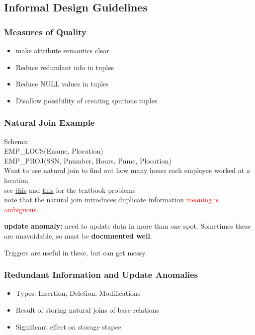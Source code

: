 \documentclass[12pt]{article}
\begin{document}
\subsection{Informal Design Guidelines}
\subsubsection{Measures of Quality}
\begin{itemize}
  \item make attribute semantics clear
  \item Reduce redundant info in tuples
  \item Reduce NULL values in tuples
  \item Disallow possibility of creating spurious tuples
\end{itemize}

\subsubsection{Natural Join Example}
Schema:\\
EMP\_LOCS(Ename, Plocation)\\
EMP\_PROJ(SSN, Pnumber, Hours, Pnme, Plocation)\\
Want to use natural join to find out how many hours each employee worked at a
location\\
see
\href{http://cise.ufl.edu/class/cis4301sp14/slides/natural_join0.jpg}{this} and
\href{http://cise.ufl.edu/class/cis4301sp14/slides/natural_join0.jpg}{this}
for the textbook problems\\
note that the natural join introduces duplicate information
\textcolor{red}{meaning is ambiguous}.

\textbf{update anomaly:} need to update data in more than one spot. Sometimes
these are unavoidable, so must be \textbf{documented well}.

Triggers are useful in these, but can get messy.

\subsubsection{Redundant Information and Update Anomalies}
\begin{itemize}
  \item {Types: Insertion, Deletion, Modifications}
  \item {Result of storing natural joins of base relations}
  \item {Significant effect on storage stapce}
\end{itemize}
\end{document}
